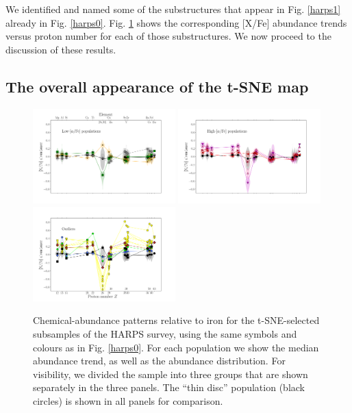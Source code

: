 \documentclass{aa}  %
\begin{document}
We identified and named some of the substructures that appear in Fig. \ref{harps1} already in Fig. \ref{harps0}. Fig. \ref{harps3} shows the corresponding [X/Fe] abundance trends versus proton number for each of those substructures. 
We now proceed to the discussion of these results.

\subsection{The overall appearance of the t-SNE map}

\begin{figure}\centering
 \includegraphics[trim=0cm 2cm 0cm 0cm, clip=true, width=0.49\textwidth]{im/harps_tsne_abundances-relto-Fe_thin.png}
 \includegraphics[trim=0cm 2cm 0cm 2cm, clip=true, width=0.49\textwidth]{im/harps_tsne_abundances-relto-Fe_thick.png}
 \includegraphics[trim=0cm 0 0cm 2cm, clip=true, width=0.49\textwidth]{im/harps_tsne_abundances-relto-Fe_strange.png}
\caption{Chemical-abundance patterns relative to iron for the t-SNE-selected subsamples of the HARPS survey, using the same symbols and colours as in Fig. \ref{harps0}. For each population we show the median abundance trend, as well as the abundance distribution. For visibility, we divided the sample into three groups that are shown separately in the three panels. The ``thin disc'' population (black circles) is shown in all panels for comparison.}
\label{harps3}
\end{figure}
\end{document}

